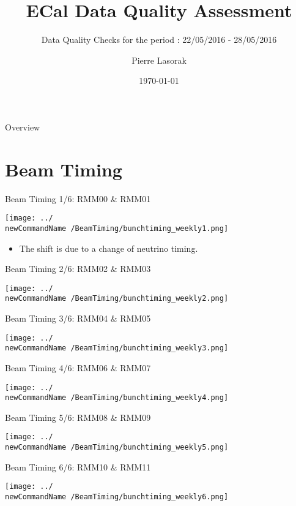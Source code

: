 \documentclass{beamer}
\title{ECal Data Quality Assessment}
\subtitle{Data Quality Checks for the period : 22/05/2016 - 28/05/2016}
\author{Pierre Lasorak}
\date{\today}
\institute{\texttt{[image: images/QM\_logo.png]}}
\newcommand{\newCommandName}{0522-0528}
\begin{document}
\maketitle

\begin{frame}{Overview}
  \tableofcontents
\end{frame}

\section{Beam Timing}
\begin{frame}{Beam Timing 1/6: RMM00 \& RMM01}
  \begin{center}
    \texttt{[image: ../\\newCommandName /BeamTiming/bunchtiming\_weekly1.png]}
    \begin{footnotesize}
      \begin{itemize}
      \item The shift is due to a change of neutrino timing.
      \end{itemize}
    \end{footnotesize}
  \end{center}
\end{frame}
\begin{frame}{Beam Timing 2/6: RMM02 \& RMM03}
  \begin{center}
    \texttt{[image: ../\\newCommandName /BeamTiming/bunchtiming\_weekly2.png]}
  \end{center}
\end{frame}
\begin{frame}{Beam Timing 3/6: RMM04 \& RMM05}
  \begin{center}
    \texttt{[image: ../\\newCommandName /BeamTiming/bunchtiming\_weekly3.png]}
  \end{center}
\end{frame}
\begin{frame}{Beam Timing 4/6: RMM06 \& RMM07}
  \begin{center}
    \texttt{[image: ../\\newCommandName /BeamTiming/bunchtiming\_weekly4.png]}
  \end{center}
\end{frame}
\begin{frame}{Beam Timing 5/6: RMM08 \& RMM09}
  \begin{center}
    \texttt{[image: ../\\newCommandName /BeamTiming/bunchtiming\_weekly5.png]}
  \end{center}	
\end{frame}
\begin{frame}{Beam Timing 6/6: RMM10 \& RMM11}
  \begin{center}
    \texttt{[image: ../\\newCommandName /BeamTiming/bunchtiming\_weekly6.png]}
  \end{center}
  
\end{frame}
\end{document}
